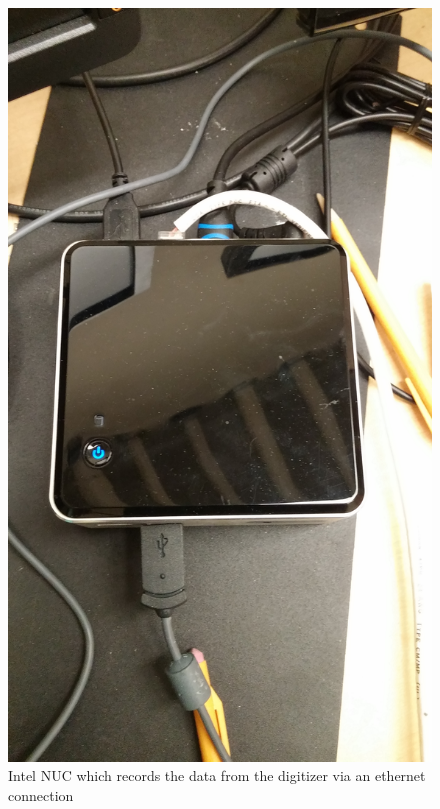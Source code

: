 \documentclass[]{article}
\begin{document}
\begin{figure}
  \includegraphics[width=\textwidth]{nuc.jpg}
  \caption{Intel NUC which records the data from the digitizer via an ethernet connection}
\end{figure}
\end{document}
